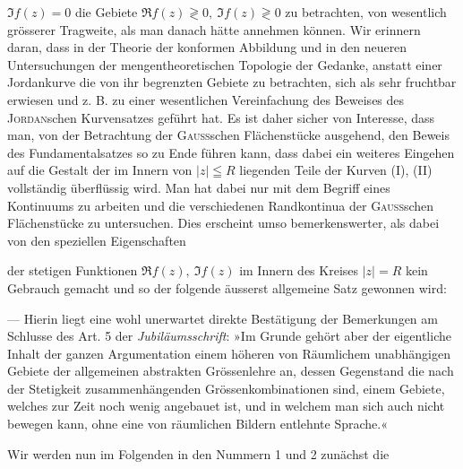 \(\Im f(z)=0\) die Gebiete \(\Re f(z)\gtrless0,\ \Im f(z)\gtrless0\) zu betrachten, von wesentlich
grösserer Tragweite, als man danach hätte annehmen können. Wir erinnern
daran, dass in der Theorie der konformen Abbildung und in
den neueren Untersuchungen der mengentheoretischen Topologie der Gedanke,
anstatt einer Jordankurve die von ihr begrenzten Gebiete zu betrachten,
sich als sehr fruchtbar erwiesen und z. B. zu einer wesentlichen Vereinfachung
des Beweises des \textsc{Jordan}schen Kurvensatzes geführt hat. Es ist
daher sicher von Interesse, dass man, von der Betrachtung der \textsc{Gauss}schen
Flächenstücke ausgehend, den Beweis des Fundamentalsatzes so zu Ende
führen kann, dass dabei ein weiteres Eingehen auf die Gestalt der im Innern
von \(|z|\leqq R\) liegenden Teile der Kurven (I), (II) vollständig überflüssig wird.
Man hat dabei nur mit dem Begriff eines Kontinuums zu arbeiten und die verschiedenen
Randkontinua der \textsc{Gauss}schen Flächenstücke zu untersuchen. Dies
erscheint umso bemerkenswerter, als dabei von den speziellen Eigenschaften\par
\clearpage{}
\noindent der stetigen Funktionen \(\Re f(z),\ \Im f(z)\) im Innern des Kreises \(|z|=R\) kein Gebrauch
gemacht und so der folgende äusserst allgemeine Satz gewonnen wird:
\par
{} — Hierin
liegt eine wohl unerwartet direkte Bestätigung der Bemerkungen am Schlusse
des Art. 5 der \textit{Jubiläumsschrift}: »Im Grunde gehört aber der eigentliche Inhalt
der ganzen Argumentation einem höheren von Räumlichem unabhängigen
Gebiete der allgemeinen abstrakten Grössenlehre an, dessen Gegenstand die
nach der Stetigkeit zusammenhängenden Grössenkombinationen sind, einem
Gebiete, welches zur Zeit noch wenig angebauet ist, und in welchem man
sich auch nicht bewegen kann, ohne eine von räumlichen Bildern entlehnte
Sprache.«
\par
Wir werden nun im Folgenden in den Nummern 1 und 2 zunächst die
